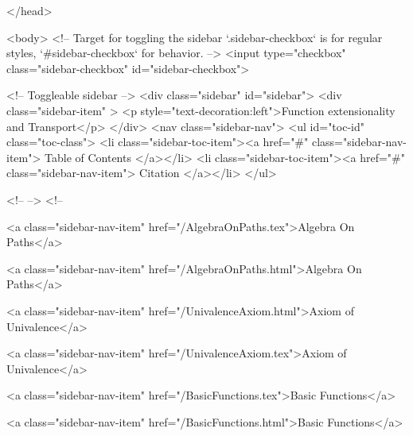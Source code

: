   
</head>




  <body>
    <!-- Target for toggling the sidebar `.sidebar-checkbox` is for regular
     styles, `#sidebar-checkbox` for behavior. -->
<input type="checkbox" class="sidebar-checkbox" id="sidebar-checkbox">

<!-- Toggleable sidebar -->
<div class="sidebar" id="sidebar">
  <div class="sidebar-item" >
    <p style="text-decoration:left">Function extensionality and Transport</p>
  </div>
  <nav class="sidebar-nav">
    <ul id="toc-id" class="toc-class">
  <li class="sidebar-toc-item"><a href="#" class="sidebar-nav-item"> Table of Contents </a></li>
  <li class="sidebar-toc-item"><a href="#" class="sidebar-nav-item"> Citation </a></li>
</ul>


    <!--  -->
    <!-- 
      
    
      
    
      
    
      
        
      
    
      
        
          <a class="sidebar-nav-item" href="/AlgebraOnPaths.tex">Algebra On Paths</a>
        
      
    
      
        
          <a class="sidebar-nav-item" href="/AlgebraOnPaths.html">Algebra On Paths</a>
        
      
    
      
        
          <a class="sidebar-nav-item" href="/UnivalenceAxiom.html">Axiom of Univalence</a>
        
      
    
      
        
          <a class="sidebar-nav-item" href="/UnivalenceAxiom.tex">Axiom of Univalence</a>
        
      
    
      
        
          <a class="sidebar-nav-item" href="/BasicFunctions.tex">Basic Functions</a>
        
      
    
      
        
          <a class="sidebar-nav-item" href="/BasicFunctions.html">Basic Functions</a>
        
      
    
      
        
